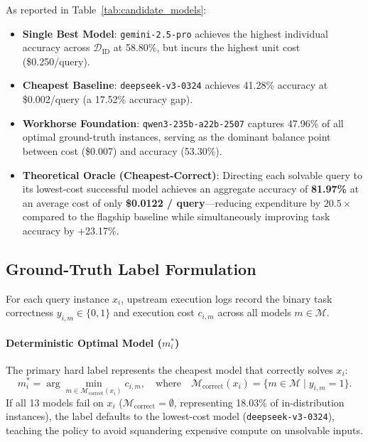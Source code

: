 \documentclass[11pt,a4paper]{article}
\begin{document}
As reported in Table~\ref{tab:candidate_models}:
\begin{itemize}
    \item \textbf{Single Best Model}: \texttt{gemini-2.5-pro} achieves the highest individual accuracy across $\mathcal{D}_{\text{ID}}$ at 58.80\%, but incurs the highest unit cost (\$0.250/query).
    \item \textbf{Cheapest Baseline}: \texttt{deepseek-v3-0324} achieves 41.28\% accuracy at \$0.002/query (a 17.52\% accuracy gap).
    \item \textbf{Workhorse Foundation}: \texttt{qwen3-235b-a22b-2507} captures 47.96\% of all optimal ground-truth instances, serving as the dominant balance point between cost (\$0.007) and accuracy (53.30\%).
    \item \textbf{Theoretical Oracle (Cheapest-Correct)}: Directing each solvable query to its lowest-cost successful model achieves an aggregate accuracy of \textbf{81.97\%} at an average cost of only \textbf{\$0.0122 / query}---reducing expenditure by $20.5\times$ compared to the flagship baseline while simultaneously improving task accuracy by +23.17\%.
\end{itemize}

\subsection{Ground-Truth Label Formulation}
\label{subsec:label_formulation}

For each query instance $x_i$, upstream execution logs record the binary task correctness $y_{i,m} \in \{0, 1\}$ and execution cost $c_{i,m}$ across all models $m \in \mathcal{M}$.

\paragraph{Deterministic Optimal Model ($m^*_i$)}
The primary hard label represents the cheapest model that correctly solves $x_i$:
\begin{equation}
m^*_i = \arg\min_{m \in \mathcal{M}_{\text{correct}}(x_i)} c_{i,m}, \quad \text{where} \quad \mathcal{M}_{\text{correct}}(x_i) = \{m \in \mathcal{M} \mid y_{i,m} = 1\}.
\end{equation}
If all 13 models fail on $x_i$ ($\mathcal{M}_{\text{correct}} = \emptyset$, representing 18.03\% of in-distribution instances), the label defaults to the lowest-cost model (\texttt{deepseek-v3-0324}), teaching the policy to avoid squandering expensive compute on unsolvable inputs.
\end{document}
